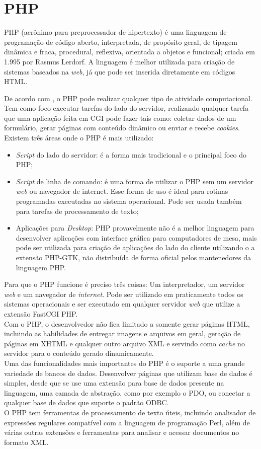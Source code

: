 \section{PHP}
PHP (acrônimo para preprocessador de hipertexto) é uma linguagem de programação 
de código aberto, interpretada, de propósito geral, de tipagem dinâmica e 
fraca, procedural, reflexiva, orientada a objetos e funcional; criada em 1.995 
por Rasmus Lerdorf. A linguagem é melhor utilizada para criação de sistemas 
baseados na \textit{web}, já que pode ser inserida diretamente em códigos 
HTML.

De acordo com , o PHP pode realizar qualquer tipo de 
atividade computacional. Tem como foco executar tarefas do lado do servidor, 
realizando qualquer tarefa que uma aplicação feita em CGI pode fazer tais como: 
coletar dados de um formulário, gerar páginas com conteúdo dinâmico ou enviar e 
recebe \textit{cookies}. Existem três áreas onde o PHP é mais utilizado:

\begin{itemize}
	\item \textit{Script} do lado do servidor: é a forma mais tradicional e o 
	principal foco do PHP;
	\item \textit{Script} de linha de comando: é uma forma de utilizar o PHP 
	sem um servidor \textit{web} ou navegador de internet. Esse forma de uso é 
	ideal para rotinas programadas executadas no sistema operacional. Pode ser 
	usada também para tarefas de processamento de texto;
	\item Aplicações para \textit{Desktop}: PHP provavelmente não é a melhor 
	linguagem para desenvolver aplicações com interface gráfica para 
	computadores de mesa, mais pode ser utilizada para criação de aplicações do 
	lado do cliente utilizando o a extensão PHP-GTK, não distribuída de forma 
	oficial pelos mantenedores da linguagem PHP.
\end{itemize}

Para que o PHP funcione é preciso três coisas: Um interpretador, um servidor 
\textit{web} e um navegador de \textit{internet}. Pode ser utilizado em 
praticamente todos os sistemas operacionais e ser executado em qualquer 
servidor \textit{web} que utilize a extensão FastCGI PHP.\\
Com o PHP, o desenvolvedor não fica limitado a somente gerar páginas HTML, 
incluindo as habilidades de entregar imagens e arquivos em geral, geração de 
páginas em XHTML e qualquer outro arquivo XML e servindo como \textit{cache} no 
servidor para o conteúdo gerado dinamicamente.\\
Uma das funcionalidades mais importantes do PHP é o suporte a uma grande 
variedade de bancos de dados. Desenvolver páginas que utilizam base de dados é 
simples, desde que se use uma extensão para base de dados presente na 
linguagem, uma camada de abstração, como por exemplo o PDO, ou conectar a 
qualquer base de dados que suporte o padrão ODBC.\\
O PHP tem ferramentas de processamento de texto úteis, incluindo analisador de 
expressões regulares compatível com a linguagem de programação Perl, além de 
várias outras extensões e ferramentas para analisar e acessar documentos no 
formato XML.


